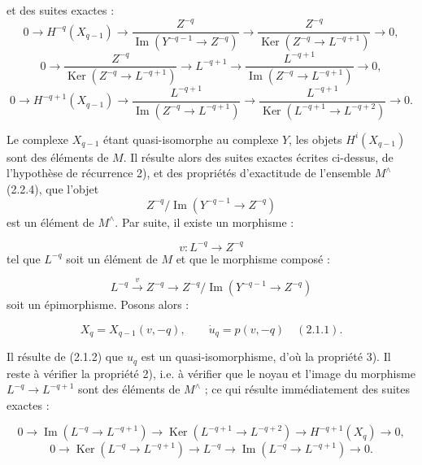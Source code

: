 \clearpage
{}%
\begingroup\small\setlength{\parskip}{0pt}\setlength{\emergencystretch}{1.5em}
\setlength{\abovedisplayskip}{4pt plus 2pt minus 2pt}%
\setlength{\belowdisplayskip}{4pt plus 2pt minus 2pt}%

et des suites exactes :
\[
0\longrightarrow H^{-q}(X_{q-1})\longrightarrow
\frac{Z^{-q}}{\operatorname{Im}(Y^{-q-1}\longrightarrow Z^{-q})}
\longrightarrow
\frac{Z^{-q}}{\operatorname{Ker}(Z^{-q}\longrightarrow L^{-q+1})}
\longrightarrow0,
\]
\[
0\longrightarrow
\frac{Z^{-q}}{\operatorname{Ker}(Z^{-q}\longrightarrow L^{-q+1})}
\longrightarrow L^{-q+1}\longrightarrow
\frac{L^{-q+1}}{\operatorname{Im}(Z^{-q}\longrightarrow L^{-q+1})}
\longrightarrow0,
\]
\[
0\longrightarrow H^{-q+1}(X_{q-1})\longrightarrow
\frac{L^{-q+1}}{\operatorname{Im}(Z^{-q}\longrightarrow L^{-q+1})}
\longrightarrow
\frac{L^{-q+1}}{\operatorname{Ker}(L^{-q+1}\longrightarrow L^{-q+2})}
\longrightarrow0.
\]

Le complexe $X_{q-1}$ étant quasi-isomorphe au complexe $Y$, les objets
$H^i(X_{q-1})$ sont des éléments de $M$. Il résulte alors des suites exactes
écrites ci-dessus, de l'hypothèse de récurrence 2), et des propriétés
d'exactitude de l'ensemble $M^\wedge$ (2.2.4), que l'objet
\[
Z^{-q}/\operatorname{Im}(Y^{-q-1}\longrightarrow Z^{-q})
\]
est un élément de $M^\wedge$. Par suite, il existe un morphisme :

\[
v\colon L^{-q}\longrightarrow Z^{-q}
\]
tel que $L^{-q}$ soit un élément de $M$ et que le morphisme composé :

\[
L^{-q}\xrightarrow{v}Z^{-q}\longrightarrow
Z^{-q}/\operatorname{Im}(Y^{-q-1}\longrightarrow Z^{-q})
\]
soit un épimorphisme. Posons alors :

\[
X_q=X_{q-1}(v,-q),
\qquad
\dot u_q=p(v,-q)\quad(2.1.1).
\]

Il résulte de (2.1.2) que $u_q$ est un quasi-isomorphisme, d'où la propriété
3). Il reste à vérifier la propriété 2), i.e. à vérifier que le noyau et
l'image du morphisme $L^{-q}\longrightarrow L^{-q+1}$ sont des éléments de
$M^\wedge$ ; ce qui résulte immédiatement des suites exactes :

\[
0\longrightarrow\operatorname{Im}(L^{-q}\longrightarrow L^{-q+1})
\longrightarrow\operatorname{Ker}(L^{-q+1}\longrightarrow L^{-q+2})
\longrightarrow H^{-q+1}(X_q)\longrightarrow0,
\]
\[
0\longrightarrow\operatorname{Ker}(L^{-q}\longrightarrow L^{-q+1})
\longrightarrow L^{-q}\longrightarrow
\operatorname{Im}(L^{-q}\longrightarrow L^{-q+1})\longrightarrow0.
\]

